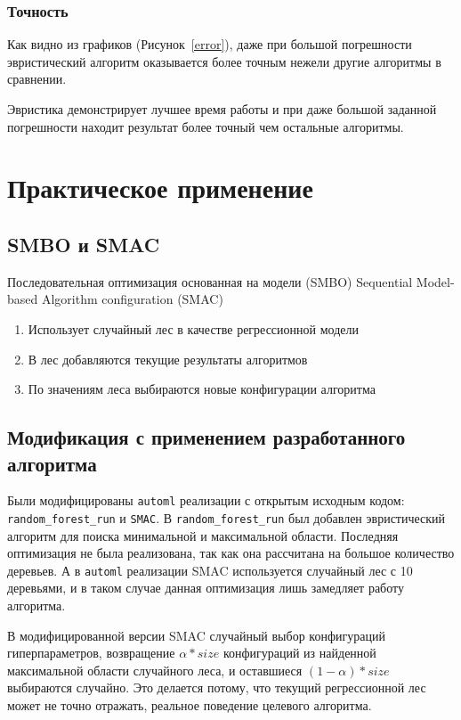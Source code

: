 \subsection{Точность}

Как видно из графиков (Рисунок~\ref{error}), даже при большой погрешности эвристический алгоритм
оказывается более точным нежели другие алгоритмы в сравнении.

\chapterconclusion{}

Эвристика демонстрирует лучшее время работы и при даже большой заданной
погрешности находит результат более точный чем остальные алгоритмы.

\chapter{Практическое применение}

\section{SMBO и SMAC}

Последовательная оптимизация основанная на модели (SMBO) Sequential Model-based
Algorithm configuration\cite{smbo} (SMAC)

\begin{enumerate}
\item Использует случайный лес в качестве регрессионной модели\cite{usesmbo}
\item В лес добавляются текущие результаты алгоритмов
\item По значениям леса выбираются новые конфигурации алгоритма
\end{enumerate}

\section{Модификация с применением разработанного алгоритма}
    
Были модифицированы \texttt{automl} реализации с открытым исходным кодом:
\texttt{random\_forest\_run} и \texttt{SMAC}. В \texttt{random\_forest\_run} был
добавлен эвристический алгоритм для поиска минимальной и максимальной области.
Последняя оптимизация не была реализована, так как она рассчитана на большое
количество деревьев. А в \texttt{automl} реализации SMAC используется случайный
лес с 10 деревьями, и в таком случае данная оптимизация лишь замедляет работу
алгоритма.

В модифицированной версии SMAC случайный выбор конфигураций гиперпараметров,
возвращение $\alpha * size$ конфигураций из найденной максимальной области
случайного леса, и оставшиеся $(1 - \alpha) * size$ выбираются случайно. Это
делается потому, что текущий регрессионной лес может не точно отражать, реальное
поведение целевого алгоритма.

